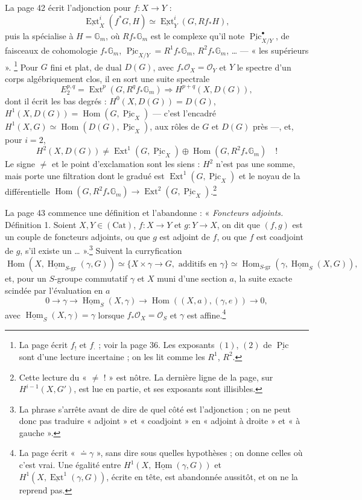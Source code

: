 \documentclass[11pt,a4paper]{article}
\begin{document}
La page 42 écrit l'adjonction pour $f\colon X \to Y$ :
\[ \boxed{\underline{\operatorname{Ext}}^i_X(f^*G, H) \simeq
\underline{\operatorname{Ext}}^i_Y(G, Rf_*H)} , \]
puis la spécialise à $H = \mathbb{G}_m$, où $Rf_*\mathbb{G}_m$ est le complexe
qu'il note $\underline{\operatorname{Pic}}^\bullet_{X/Y}$, de faisceaux de
cohomologie $f_*\mathbb{G}_m$, $\underline{\operatorname{Pic}}_{X/Y} =
R^1f_*\mathbb{G}_m$, $R^2f_*\mathbb{G}_m$, \ldots{} --- « les supérieurs ».
\footnote{La page écrit $f_!$ et $f_{\cdot}$ ; voir la page 36. Les exposants
$(1)$, $(2)$ de $\underline{\operatorname{Pic}}$ sont d'une lecture incertaine ;
on les lit comme les $R^1$, $R^2$.} Pour $G$ fini et plat, de dual $D(G)$, avec
$f_*\mathcal{O}_X = \mathcal{O}_Y$ et $Y$ le spectre d'un corps algébriquement
clos, il en sort une suite spectrale
\[ E_2^{p,q} = \operatorname{Ext}^p(G, R^qf_*\mathbb{G}_m) \Rightarrow
H^{p+q}(X, D(G)) , \]
dont il écrit les bas degrés : $H^0(X, D(G)) = D(G)$, $H^1(X, D(G)) =
\operatorname{Hom}(G, \underline{\operatorname{Pic}}_X)$ --- c'est l'encadré
$H^1(X, G) \simeq \operatorname{Hom}(D(G), \underline{\operatorname{Pic}}_X)$, aux
rôles de $G$ et $D(G)$ près ---, et, pour $i = 2$,
\[ H^2(X, D(G)) \neq \operatorname{Ext}^1(G, \underline{\operatorname{Pic}}_X)
\oplus \operatorname{Hom}(G, R^2f_*\mathbb{G}_m) \quad ! \]
Le signe $\neq$ et le point d'exclamation sont les siens : $H^2$ n'est pas une
somme, mais porte une filtration dont le gradué est $\operatorname{Ext}^1(G,
\underline{\operatorname{Pic}}_X)$ et le noyau de la différentielle
$\operatorname{Hom}(G, R^2f_*\mathbb{G}_m) \to \operatorname{Ext}^2(G,
\underline{\operatorname{Pic}}_X)$.\footnote{Cette lecture du « $\neq$ ! » est
nôtre. La dernière ligne de la page, sur $H^{i-1}(X, G')$, est lue en partie, et
ses exposants sont illisibles.}

La page 43 commence une définition et l'abandonne : « \emph{Foncteurs adjoints.}
Définition 1. Soient $X, Y \in (\mathrm{Cat})$, $f\colon X \to Y$ et $g\colon Y
\to X$, on dit que $(f, g)$ est un couple de foncteurs adjoints, ou que $g$ est
adjoint de $f$, ou que $f$ est coadjoint de $g$, s'il existe un \ldots
».\footnote{La phrase s'arrête avant de dire de quel côté est l'adjonction ; on ne
peut donc pas traduire « adjoint » et « coadjoint » en « adjoint à droite » et « à
gauche ».} Suivent la curryfication
\[ \operatorname{Hom}(X, \underline{\operatorname{Hom}}_{S\text{-gr}}(\gamma,
G)) \simeq \{X \times \gamma \to G, \text{ additifs en } \gamma\} \simeq
\operatorname{Hom}_{S\text{-gr}}(\gamma, \underline{\operatorname{Hom}}_S(X, G)) ,
\]
et, pour un $S$-groupe commutatif $\gamma$ et $X$ muni d'une section $a$, la suite
exacte scindée par l'évaluation en $a$
\[ 0 \to \gamma \to \underline{\operatorname{Hom}}_S(X, \gamma) \to
\operatorname{Hom}((X, a), (\gamma, e)) \to 0 , \]
avec $\underline{\operatorname{Hom}}_S(X, \gamma) = \gamma$ lorsque
$f_*\mathcal{O}_X = \mathcal{O}_S$ et $\gamma$ est affine.\footnote{La page écrit
« $\doteq \gamma$ », sans dire sous quelles hypothèses ; on donne celles où c'est
vrai. Une égalité entre $H^1(X, \underline{\operatorname{Hom}}(\gamma, G))$ et
$H^1(X, \underline{\operatorname{Ext}}^1(\gamma, G))$, écrite en tête, est
abandonnée aussitôt, et on ne la reprend pas.}
\end{document}
